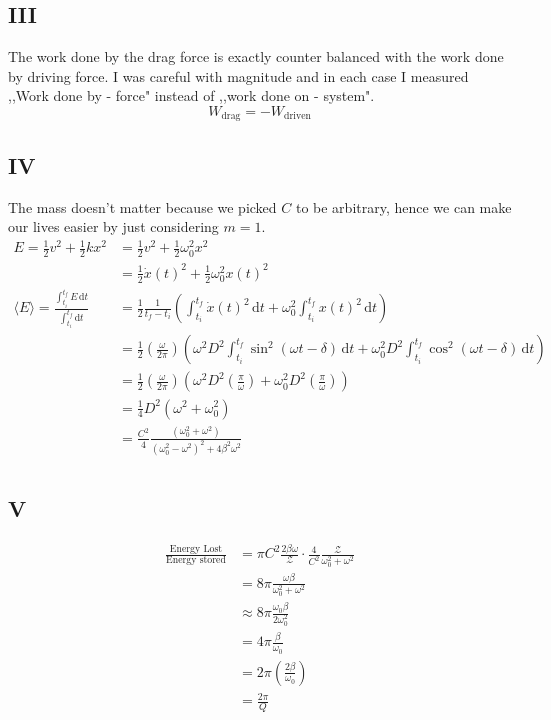 \documentclass[12pt,letter]{article}
\begin{document}
\subsection*{III} 
The work done by the drag force is exactly counter balanced with the work done by driving force. I was careful with magnitude and in each case I measured ,,Work done by - force" instead of ,,work done on - system". 
\[
	W_{\text{drag}} = - W_{\text{driven}}
\] 

\subsection*{IV} 
The mass doesn't matter because we picked $C$ to be arbitrary, hence we can make our lives easier by just considering $m = 1$. 
\begin{align*}
	E = \frac{1}{2} v^2 + \frac{1}{2} kx ^2 &= 
\frac{1}{2} v^2 + \frac{1}{2} \omega_0^2 x ^2 
	\\
&=  \frac{1}{2} \dot{x	}(t)^2 + \frac{1}{2} \omega_0^2 x(t) ^2 
	\\
	\langle E \rangle = 
	\frac{\int_{t_i}^{t_f} E \, \mathrm{d} t }{\int_{t_i}^{t_f} \mathrm{d} t } &= 
\frac{1}{2 }\frac{1}{t_f - t_i} \left(
	\int_{t_i}^{t_f} \dot{x}(t)^2 \, \mathrm{d} t + 
	\omega_0^2 \int_{t_i}^{t_f} x(t)^2  \, \mathrm{d} t
\right)
	\\ 
	&= 
\frac{1}{2} \left(\frac{\omega}{2 \pi }\right) 
\left( \omega^2 D^2 
\int_{t_i}^{t_f} \sin^2(\omega t - \delta ) \, \mathrm{d} t   
+ 
\omega_0^2  D^2
\int_{t_i}^{t_f}   \cos ^2 (\omega t - \delta) \, \mathrm{d}  t
\right)
	\\
	&= 
\frac{1}{2} \left(\frac{\omega}{2 \pi }\right) 
\left( \omega^2 D^2 
	\left( \frac{\pi}{\omega }\right)+ 
\omega_0^2  D^2
\left(\frac{\pi}{\omega}\right)\right)
	\\
	&= 
\frac{1}{4} D^2 \left(\omega^2 + \omega_0^2\right)
	\\
	&= \boxed{
\frac{C^2}{4} \frac{\left(\omega_0^2 + \omega^2 \right)}{\left(\omega_0^2 - \omega ^2\right)^2 + 4 \beta ^2 \omega^2}
}	\\
\end{align*}

\subsection*{V}
\begin{align*}
	\frac{\text{Energy Lost}}{\text{Energy stored}} &= 
\pi C^2 \frac{2 \beta \omega}{ \mathcal Z} \cdot \frac{4}{C^2} \frac{\mathcal Z}{\omega_0^2 + \omega^2 }
	\\
	&=\boxed{
8 \pi \frac{\omega \beta}{\omega_0^2 + \omega^2}
}	\\
&\approx
8 \pi \frac{\omega_0 \beta}{2 \omega_0^2} \tag{$\beta \to 0 \implies \omega_0 \approx \omega$}
\\
&= 
4\pi \frac{\beta}{\omega_0}
\\
&= 
2\pi \left(\frac{2 \beta}{\omega_0}\right)
\\
&= \boxed{
\frac{2\pi}{Q}
}\\
\end{align*}
\end{document}
